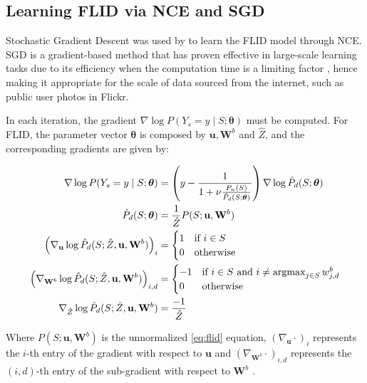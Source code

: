 \subsection{Learning FLID via NCE and SGD}

Stochastic Gradient Descent was used by \citet{tschiatschek16learning} to learn the FLID model through NCE. SGD is a gradient-based method that has proven effective in large-scale learning tasks due to its efficiency when the computation time is a limiting factor \citep{Bottou2010, Zhang2004}, hence making it appropriate for the scale of data sourced from the internet, such as public user photos in Flickr.

In each iteration, the gradient $\nabla \log{P(Y_{s} = y \mid S;\boldsymbol{\theta})}$ must be computed. For FLID, the parameter vector $\boldsymbol{\theta}$ is composed by $\mathbf{u}, \mathbf{W}^{b}$ and $\hat{Z}$, and the corresponding gradients are given by:

\begin{align}
  \label{eq:gradient-flid-1}
  \nabla \log{P(Y_{s} = y \mid S;\boldsymbol{\theta})} &= \left(y - \frac{1}{1 + \nu \frac{P_{n}(S)}{\hat{P}_{d}(S;\boldsymbol{\theta})}}\right) \nabla \log{\hat{P}_{d}(S;\boldsymbol{\theta})} \\
  \label{eq:gradient-flid-2}
  \hat{P}_{d}(S;\boldsymbol{\theta}) &= \frac{1}{\hat{Z}}P(S; \mathbf{u}, \mathbf{W}^{b}) \\
  \left(\nabla_{\mathbf{u}}\log{\hat{P}_{d}(S; \hat{Z}, \mathbf{u}, \mathbf{W}^{b})}\right)_{i} &= \begin{cases}
    1 &  \text{if}\ i \in S \\
    0 & \text{otherwise}
  \end{cases} \\
  \label{eq:gradient-flid-3}
  \left(\nabla_{\mathbf{W}^{b}}\log{\hat{P}_{d}(S; \hat{Z}, \mathbf{u}, \mathbf{W}^{b})}\right)_{i,d} &= \begin{cases}
    -1 & \text{if}\ i \in S\ \text{and}\ i \neq \operatorname*{argmax}_{j \in S}{w^{b}_{j,d}} \\
    0 & \text{otherwise}
  \end{cases} \\
  \label{eq:gradient-flid-4}
  \nabla_{\hat{Z}}\log{\hat{P}_{d}(S; \hat{Z}, \mathbf{u}, \mathbf{W}^{b})}&= \frac{-1}{\hat{Z}}
\end{align}

Where $P(S;\mathbf{u}, \mathbf{W}^{b})$ is the unnormalized \eqref{eq:flid} equation, $\left(\nabla_{\mathbf{u}}\cdot \right)_{i}$ represents the $i$-th entry of the gradient with respect to $\mathbf{u}$ and $\left(\nabla_{\mathbf{W}^{b}}\cdot\right)_{i,d}$ represents the $(i,d)$-th entry of the sub-gradient with respect to $\mathbf{W}^{b}$ \citep{tschiatschek16learning}.

